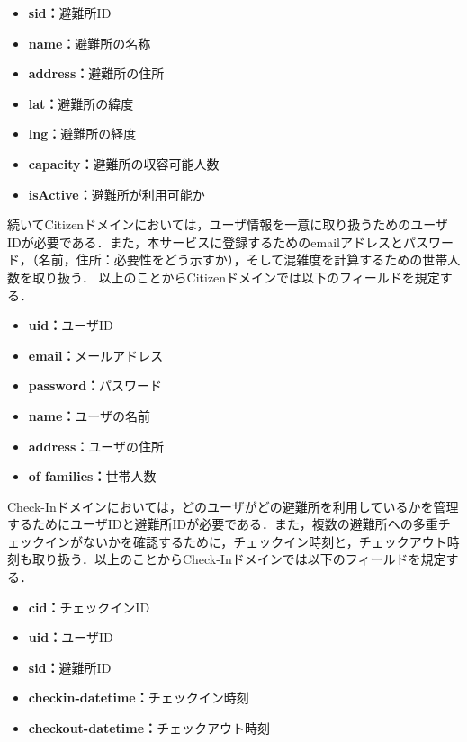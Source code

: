 \documentclass[technicalreport]{ieicej}
\begin{document}
\begin{itemize}
    \item{\textbf{sid：}}避難所ID
    \item{\textbf{name：}}避難所の名称
    \item{\textbf{address：}}避難所の住所
    \item{\textbf{lat：}}避難所の緯度
    \item{\textbf{lng：}}避難所の経度
    \item{\textbf{capacity：}}避難所の収容可能人数
    \item{\textbf{isActive：}}避難所が利用可能か
\end{itemize}

続いてCitizenドメインにおいては，ユーザ情報を一意に取り扱うためのユーザIDが必要である．また，本サービスに登録するためのemailアドレスとパスワード，（名前，住所：必要性をどう示すか），そして混雑度を計算するための世帯人数を取り扱う．%
以上のことからCitizenドメインでは以下のフィールドを規定する．

\begin{itemize}
    \item{\textbf{uid：}}ユーザID
    \item{\textbf{email：}}メールアドレス
    \item{\textbf{password：}}パスワード
    \item{\textbf{name：}}ユーザの名前
    \item{\textbf{address：}}ユーザの住所
    \item{\textbf{of families：}}世帯人数
\end{itemize}

Check-Inドメインにおいては，どのユーザがどの避難所を利用しているかを管理するためにユーザIDと避難所IDが必要である．また，複数の避難所への多重チェックインがないかを確認するために，チェックイン時刻と，チェックアウト時刻も取り扱う．以上のことからCheck-Inドメインでは以下のフィールドを規定する．

\begin{itemize}
    \item{\textbf{cid：}}チェックインID
    \item{\textbf{uid：}}ユーザID
    \item{\textbf{sid：}}避難所ID
    \item{\textbf{checkin-datetime：}}チェックイン時刻
    \item{\textbf{checkout-datetime：}}チェックアウト時刻
\end{itemize}
\end{document}
